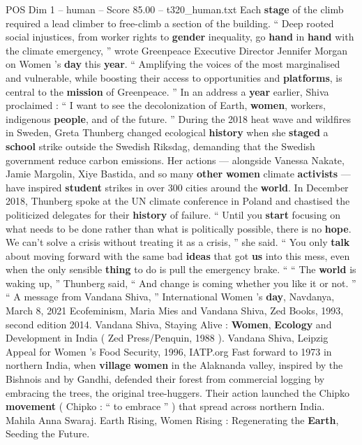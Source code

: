 \begin{textsample}{POS Dim 1 – human – Score 85.00 – t320\_human.txt}
Each \textbf{stage} of the climb required a lead climber to free-climb a section of the building. “ Deep rooted social injustices, from worker rights to \textbf{gender} inequality, go \textbf{hand} in \textbf{hand} with the climate emergency, ” wrote Greenpeace Executive Director Jennifer Morgan on Women ’s \textbf{day} this \textbf{year}. “ Amplifying the voices of the most marginalised and vulnerable, while boosting their access to opportunities and \textbf{platforms}, is central to the \textbf{mission} of Greenpeace. ” In an address a \textbf{year} earlier, Shiva proclaimed : “ I want to see the decolonization of Earth, \textbf{women}, workers, indigenous \textbf{people}, and of the future. ” During the 2018 heat wave and wildfires in Sweden, Greta Thunberg changed ecological \textbf{history} when she \textbf{staged} a \textbf{school} strike outside the Swedish Riksdag, demanding that the Swedish government reduce carbon emissions.
Her actions — alongside Vanessa Nakate, Jamie Margolin, Xiye Bastida, and so many \textbf{other} \textbf{women} climate \textbf{activists} — have inspired \textbf{student} strikes in over 300 cities around the \textbf{world}.
In December 2018, Thunberg spoke at the UN climate conference in Poland and chastised the politicized delegates for their \textbf{history} of failure. “ Until you \textbf{start} focusing on what needs to be done rather than what is politically possible, there is no \textbf{hope}.
We can't solve a crisis without treating it as a crisis, ” she said. “ You only \textbf{talk} about moving forward with the same bad \textbf{ideas} that got \textbf{us} into this mess, even when the only sensible \textbf{thing} to do is pull the emergency brake. “ “ The \textbf{world} is waking up, ” Thunberg said, “ And change is coming whether you like it or not. ” “ A message from Vandana Shiva, ” International Women ’s \textbf{day}, Navdanya, March 8, 2021 Ecofeminism, Maria Mies and Vandana Shiva, Zed Books, 1993, second edition 2014.
Vandana Shiva, Staying Alive : \textbf{Women}, \textbf{Ecology} and Development in India ( Zed Press/Penquin, 1988 ).
Vandana Shiva, Leipzig Appeal for Women ’s Food Security, 1996, IATP.org Fast forward to 1973 in northern India, when \textbf{village} \textbf{women} in the Alaknanda valley, inspired by the Bishnois and by Gandhi, defended their forest from commercial logging by embracing the trees, the original tree-huggers.
Their action launched the Chipko \textbf{movement} ( Chipko : “ to embrace ” ) that spread across northern India.
Mahila Anna Swaraj.
Earth Rising, Women Rising : Regenerating the \textbf{Earth}, Seeding the Future.

\end{textsample}

